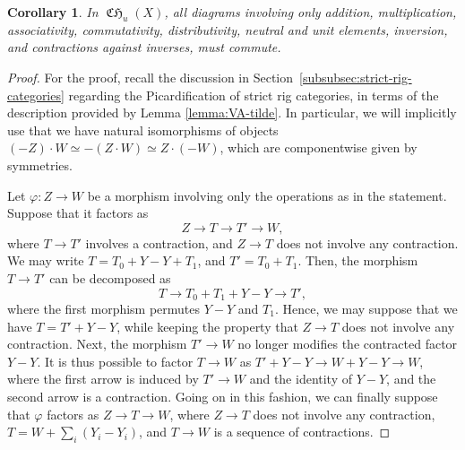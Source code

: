 \documentclass[JEP,XML,SOM,Unicode,published]{cedram}
\theoremstyle{plain}
\newtheorem{corollary}[theorem]{Corollary}
\theoremstyle{definition}
\DeclareMathOperator{\CHfrak}{\mathfrak{CH}}
\begin{document}
\begin{corollary}\label{cor:coherence}
In $\CHfrak_{u}(X)$, all diagrams involving only addition, multiplication, associativity, commutativity, distributivity, neutral and unit elements, inversion, and contractions against inverses, must commute.
\end{corollary}
\begin{proof}

For the proof, recall the discussion in Section~\ref{subsubsec:strict-rig-categories} regarding the Picardification of strict rig categories, in terms of the description provided by Lemma \ref{lemma:VA-tilde}. In particular, we will implicitly use that we have natural isomorphisms of objects $(-Z)\cdot W\simeq -(Z\cdot W)\simeq Z\cdot (-W)$, which are componentwise given by symmetries.

Let $\varphi\colon Z\to W$ be a morphism involving only the operations as in the statement. Suppose that it factors as
\begin{displaymath}
Z\to T\to T'\to W,
\end{displaymath}
where $T\to T'$ involves a contraction, and $Z\to T$ does not involve any contraction. We may write $T=T_{0}+Y-Y+T_{1}$, and $T'=T_{0}+T_{1}$. Then, the morphism $T\to T'$ can be decomposed as
\begin{displaymath}
T\to T_{0}+T_{1}+Y-Y\to T',
\end{displaymath}
where the first morphism permutes $Y-Y$ and $T_{1}$. Hence, we may suppose that we have $T=T'+Y-Y$, while keeping the property that $Z\to T$ does not involve any contraction. Next, the morphism $T'\to W$ no longer modifies the contracted factor $Y-Y$. It is thus possible to factor $T\to W$ as $T'+Y-Y\to W+Y-Y\to W$, where the first arrow is induced by $T'\to W$ and the identity of $Y-Y$, and the second arrow is a contraction. Going on in this fashion, we can finally suppose that $\varphi$ factors as $Z\to T\to W$, where $Z\to T$ does not involve any contraction, $T=W+\sum_{i}(Y_{i}-Y_{i})$, and $T\to W$ is a sequence of contractions.


\end{proof}
\end{document}
